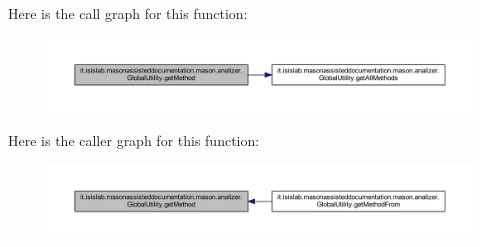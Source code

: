 Here is the call graph for this function\-:\nopagebreak
\begin{figure}[H]
\begin{center}
\leavevmode
\includegraphics[width=350pt]{classit_1_1isislab_1_1masonassisteddocumentation_1_1mason_1_1analizer_1_1_global_utility_afd0ff2a55bc28dd92665234871976820_cgraph}
\end{center}
\end{figure}




Here is the caller graph for this function\-:\nopagebreak
\begin{figure}[H]
\begin{center}
\leavevmode
\includegraphics[width=350pt]{classit_1_1isislab_1_1masonassisteddocumentation_1_1mason_1_1analizer_1_1_global_utility_afd0ff2a55bc28dd92665234871976820_icgraph}
\end{center}
\end{figure}


